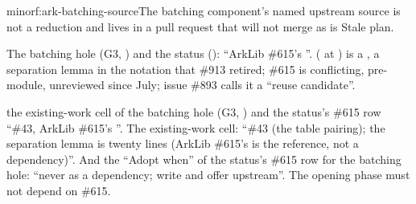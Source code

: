 \begin{finding}{minor}{f:ark-batching-source}{The batching component's named upstream source is not a reduction and lives in a pull request that will not merge as is}
 Stale plan.

 The batching hole (G3, ) and the status ():
``ArkLib \#615's ''.  ( at
) is a , a separation lemma in the  notation
that \#913 retired; \#615 is conflicting, pre-module, unreviewed since July; issue \#893 calls it
a ``reuse candidate''.

\begin{change}{the existing-work cell of the batching hole (G3, ) and the status's \#615 row}
\asis ``\#43, ArkLib \#615's ''.
\asproposed The existing-work cell: ``\#43 (the table pairing); the separation lemma is twenty
lines (ArkLib \#615's  is the reference, not a dependency)''. And the ``Adopt
when'' of the status's \#615 row for the batching hole: ``never as a dependency; write and offer
upstream''.
\reason The opening phase must not depend on \#615.
\end{change}
\end{finding}

